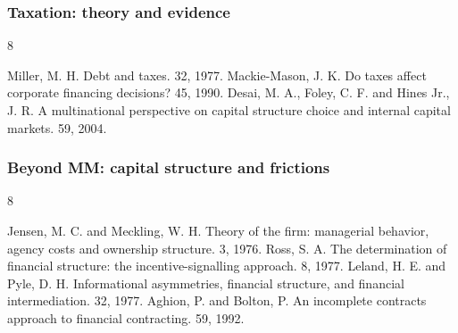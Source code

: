 \documentclass[blue]{beamer}
\theoremstyle{definition}
\theoremstyle{example}
\begin{document}
\begin{frame}\frametitle{Taxation: theory and evidence}
\begin{thebibliography}{8}
\begin{small}
\beamertemplatearticlebibitems
    Miller, M. H.
    \newblock Debt and taxes.
     32, 1977.
    Mackie-Mason, J. K.
    \newblock Do taxes affect corporate financing decisions?
     45, 1990.
    Desai, M. A., Foley, C. F. and Hines Jr., J. R.
    \newblock A multinational perspective on capital structure choice and internal capital markets.
     59, 2004.
\end{small}
\end{thebibliography}
\end{frame}

\begin{frame}\frametitle{Beyond MM: capital structure and frictions}
\begin{thebibliography}{8}
\begin{small}
\beamertemplatearticlebibitems
    Jensen, M. C. and Meckling, W. H.
    \newblock Theory of the firm: managerial behavior, agency costs and ownership structure.
     3, 1976.
    Ross, S. A.
    \newblock The determination of financial structure: the incentive-signalling approach.
     8, 1977.
    Leland, H. E. and Pyle, D. H.
    \newblock Informational asymmetries, financial structure, and financial intermediation.
     32, 1977.
    Aghion, P. and Bolton, P.
    \newblock An incomplete contracts approach to financial contracting.
     59, 1992.
\end{small}
\end{thebibliography}
\end{frame}
\end{document}
